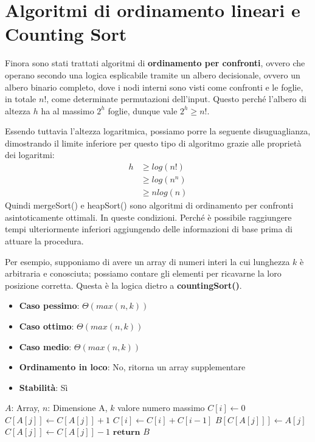 %

\section{Algoritmi di ordinamento lineari e Counting Sort}
Finora sono stati trattati algoritmi di \textbf{ordinamento per confronti}, ovvero che operano secondo una logica esplicabile tramite un albero decisionale, ovvero un albero binario completo, dove i nodi interni sono visti come confronti e le foglie, in totale $n!$, come determinate permutazioni dell'input. Questo perché l'albero di altezza $h$ ha al massimo $2^h$ foglie, dunque vale $2^h \geq n!$.\par
Essendo tuttavia l'altezza logaritmica, possiamo porre la seguente disuguaglianza, dimostrando il limite inferiore per questo tipo di algoritmo grazie alle proprietà dei logaritmi: \begin{equation}
	\begin{split}
		h &\geq log(n!)\\
			&\geq log(n^n)\\
			&\geq nlog(n)
	\end{split}
\end{equation}
\noindent Quindi mergeSort() e heapSort() sono algoritmi di ordinamento per confronti asintoticamente ottimali. In queste condizioni. Perché è possibile raggiungere tempi ulteriormente inferiori aggiungendo delle informazioni di base prima di attuare la procedura.\par
Per esempio, supponiamo di avere un array di numeri interi la cui lunghezza $k$ è arbitraria e conosciuta; possiamo contare gli elementi per ricavarne la loro posizione corretta. Questa è la logica dietro a \textbf{countingSort()}.
\begin{itemize}
	\item \textbf{Caso pessimo}: $\Theta(max(n,k))$
	\item \textbf{Caso ottimo}: $\Theta(max(n,k))$
	\item \textbf{Caso medio}: $\Theta(max(n,k))$
	\item \textbf{Ordinamento in loco}: No, ritorna un array supplementare
	\item \textbf{Stabilità}: Sì
\end{itemize}
\begin{algorithm}[H]
	\caption{countingSort(A, n, k)}
	\begin{algorithmic}[i]
		\Require $A$: Array, $n$: Dimensione A, $k$ valore numero massimo
		\State $C[i]\gets 0$ \EndFor
		\State
		 
		\State $C[A[j]]\gets C[A[j]]+1$\EndFor
		 
		\State $C[i]\gets C[i] + C[i-1]$\EndFor
		\State
		 
		\State $B[C[A[j]]]\gets A[j]$
		\State $C[A[j]]\gets C[A[j]]-1$ 
		\EndFor
		\State $\textbf{return } B$
	\end{algorithmic}
\end{algorithm}
